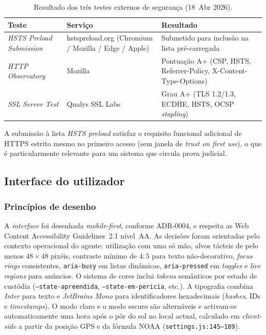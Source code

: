 \begin{table}[h]
\centering\small
\begin{tabular}{@{}L{4.5cm}L{4.0cm}L{4.5cm}@{}}
\toprule
\textbf{Teste} & \textbf{Serviço} & \textbf{Resultado} \\
\midrule
\emph{HSTS Preload Submission} & hstspreload.org (Chromium / Mozilla / Edge / Apple) & Submetido para inclusão na lista pré-carregada \\
\emph{HTTP Observatory}        & Mozilla & Pontuação A+ (CSP, HSTS, Referrer-Policy, X-Content-Type-Options) \\
\emph{SSL Server Test}         & Qualys SSL Labs & Grau A+ (TLS 1.2/1.3, ECDHE, HSTS, OCSP \emph{stapling}) \\
\bottomrule
\end{tabular}
\caption{Resultado dos três testes externos de segurança (18~Abr 2026).}
\label{tab:external}
\end{table}

A submissão à lista \emph{HSTS preload} satisfaz o requisito
funcional adicional de HTTPS estrito mesmo no primeiro acesso (sem
janela de \emph{trust on first use}), o que é particularmente
relevante para um sistema que circula prova judicial.

\subsection{Interface do utilizador}
\label{sec:ui}

\subsubsection{Princípios de desenho}
\label{sec:ui-principles}

A \emph{interface} foi desenhada \emph{mobile-first}, conforme
ADR-0004, e respeita as Web Content Accessibility Guidelines~2.1
nível~AA. As decisões foram orientadas pelo contexto operacional do
agente: utilização com uma só mão, alvos tácteis de pelo menos
$48 \times 48$ pixéis, contraste mínimo de $4{:}5$ para texto
não-decorativo, \emph{focus rings} consistentes, \texttt{aria-busy}
em listas dinâmicas, \texttt{aria-pressed} em \emph{toggles} e
\emph{live regions} para anúncios. O sistema de cores inclui
\emph{tokens} semânticos por estado de custódia
(\texttt{--state-apreendida}, \texttt{--state-em-pericia}, etc.). A
tipografia combina \emph{Inter} para texto e \emph{JetBrains Mono}
para identificadores hexadecimais (\emph{hashes}, IDs e
\emph{timestamps}). O modo claro e o modo escuro são alternáveis e
activam-se automaticamente uma hora após o pôr do sol no local
actual, calculado em \emph{client-side} a partir da posição GPS e da
fórmula NOAA (\texttt{settings.js:145--189}).

